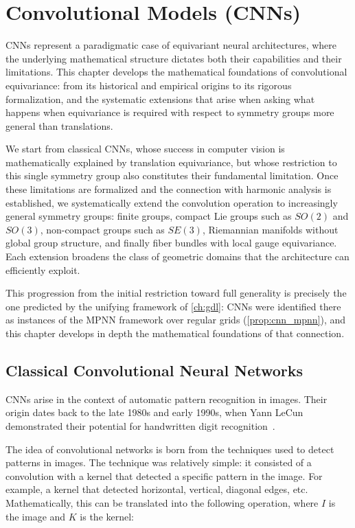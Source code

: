 \chapter{Convolutional Models (CNNs)}\label{ch:cnn}

\glspl{CNN} represent a paradigmatic case of equivariant neural architectures, where the underlying mathematical structure dictates both their capabilities and their limitations. This chapter develops the mathematical foundations of convolutional equivariance: from its historical and empirical origins to its rigorous formalization, and the systematic extensions that arise when asking what happens when equivariance is required with respect to symmetry groups more general than translations.

We start from classical \glspl{CNN}, whose success in computer vision is mathematically explained by translation equivariance, but whose restriction to this single symmetry group also constitutes their fundamental limitation. Once these limitations are formalized and the connection with harmonic analysis is established, we systematically extend the convolution operation to increasingly general symmetry groups: finite groups, compact Lie groups such as $SO(2)$ and $SO(3)$, non-compact groups such as $SE(3)$, Riemannian manifolds without global group structure, and finally fiber bundles with local gauge equivariance. Each extension broadens the class of geometric domains that the architecture can efficiently exploit.

This progression from the initial restriction toward full generality is precisely the one predicted by the unifying framework of \autoref{ch:gdl}: \glspl{CNN} were identified there as instances of the \gls{MPNN} framework over regular grids (\autoref{prop:cnn_mpnn}), and this chapter develops in depth the mathematical foundations of that connection.

\section{Classical Convolutional Neural Networks}\label{sec:cnn_clasicas}

\glspl{CNN} arise in the context of automatic pattern recognition in images. Their origin dates back to the late 1980s and early 1990s, when Yann LeCun demonstrated their potential for handwritten digit recognition~\citep{lecun1989}.

The idea of convolutional networks is born from the techniques used to detect patterns in images. The technique was relatively simple: it consisted of a convolution with a kernel that detected a specific pattern in the image. For example, a kernel that detected horizontal, vertical, diagonal edges, etc. Mathematically, this can be translated into the following operation, where \(I\) is the image and \(K\) is the kernel:

